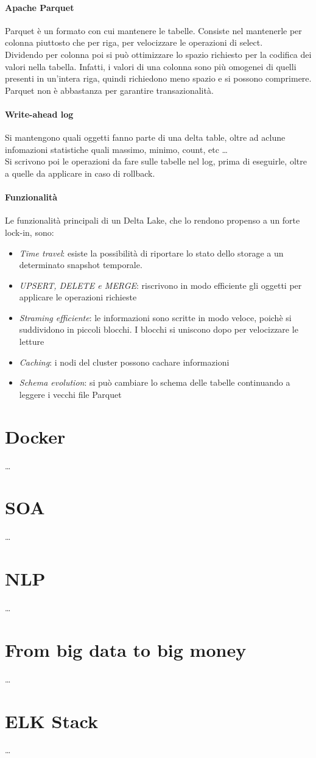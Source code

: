 \documentclass[a4paper]{article}
\begin{document}
\paragraph{Apache Parquet}
Parquet è un formato con cui mantenere le tabelle. Consiste nel mantenerle 
per colonna piuttosto che per riga, per velocizzare le operazioni di select.\\
Dividendo per colonna poi si può ottimizzare lo spazio richiesto per la codifica
dei valori nella tabella. Infatti, i valori di una colonna sono più omogenei
di quelli presenti in un'intera riga, quindi richiedono meno spazio e si possono
comprimere. Parquet non è abbastanza per garantire transazionalità.

\paragraph{Write-ahead log} 
Si mantengono quali oggetti fanno parte di una delta table, oltre ad 
aclune infomazioni statistiche quali massimo, minimo, count, etc \dots\\
Si scrivono poi le operazioni da fare sulle tabelle nel log, prima di eseguirle, 
oltre a quelle da applicare in caso di rollback.

\paragraph{Funzionalità}
Le funzionalità principali di un Delta Lake, che lo rendono propenso a un forte lock-in, sono:
\begin{itemize}
    \item \emph{Time travel}: esiste la possibilità di riportare lo stato dello storage a un determinato
    snapshot temporale.
    \item \emph{UPSERT, DELETE e MERGE}: riscrivono in modo efficiente gli oggetti per 
    applicare le operazioni richieste
    \item \emph{Straming efficiente}: le informazioni sono scritte in modo veloce, poichè 
    si suddividono in piccoli blocchi. I blocchi si uniscono dopo per velocizzare le letture
    \item \emph{Caching}: i nodi del cluster possono cachare informazioni
    \item \emph{Schema evolution}: si può cambiare lo schema delle tabelle continuando 
    a leggere i vecchi file Parquet 
\end{itemize}

\section{Docker}
\dots
\section{SOA}
\dots
\section{NLP}
\dots
\section{From big data to big money}
\dots
\section{ELK Stack}
\dots
\end{document}
